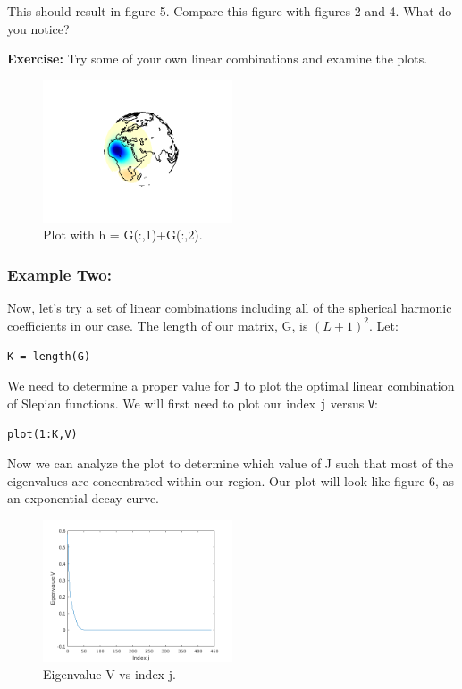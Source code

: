 \documentclass[11pt]{article}
\begin{document}
This should result in figure 5.  Compare this figure with figures 2 and 4.  What do you notice?

\textbf{Exercise:} Try some of your own linear combinations and examine the plots.

\begin{figure}[H]
  \centering
  \includegraphics[width=0.5\textwidth]{figures/hcombml.png}
  \caption{Plot with h = G(:,1)+G(:,2).}
\label{lincomb1}
\end{figure}


\subsubsection{Example Two:}
Now, let's try a set of linear combinations including all of the spherical harmonic coefficients in our case.  The length of our matrix, G, is $(L+1)^2$.  Let:

\verb|K = length(G)|

We need to determine a proper value for \verb+J+ to plot the optimal linear combination of Slepian functions.  We will first need to plot our index \verb+j+ versus \verb+V+:

\verb|plot(1:K,V)|

Now we can analyze the plot to determine which value of J such that most of the eigenvalues are concentrated within our region.  Our plot will look like figure 6, as an exponential decay curve.  

\begin{figure}[H]
  \centering
  \includegraphics[width=0.5\textwidth]{figures/Vvsj_ml.png}
  \caption{Eigenvalue V vs index j.}
\label{lincomb}
\end{figure}
\end{document}
